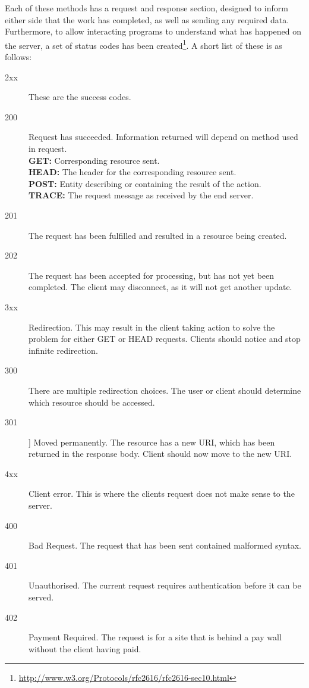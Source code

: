 \documentclass[a4paper,11pt]{report}
\begin{document}
		Each of these methods has a request and response section, 
		designed to inform either side that the work has completed, as well as sending any required data. 
		Furthermore, to allow interacting programs to understand what has happened on the server, 
		a set of status codes has been created\footnote{\url{http://www.w3.org/Protocols/rfc2616/rfc2616-sec10.html}}. 
		A short list of these is as follows:
		\begin{description}
			\item[2xx] These are the success codes. 
			\item[200] Request has succeeded. Information returned will depend on method used in request. \\
				\textbf{GET:} Corresponding resource sent. \\
				\textbf{HEAD:} The header for the corresponding resource sent. \\
				\textbf{POST:} Entity describing or containing the result of the action. \\
				\textbf{TRACE:} The request message as received by the end server. \\
			\item[201] The request has been fulfilled and resulted in a resource being created. 
			\item[202] The request has been accepted for processing, but has not yet been completed. 
				The client may disconnect, as it will not get another update. 
			\item[3xx] Redirection. 
				This may result in the client taking action to solve the problem for either GET or HEAD requests. 
				Clients should notice and stop infinite redirection. 
			\item[300] There are multiple redirection choices. 
				The user or client should determine which resource should be accessed. 
			\item[301]] Moved permanently. 
				The resource has a new URI, which has been returned in the response body. 
				Client should now move to the new URI. 
			\item[4xx] Client error.
				This is where the clients request does not make sense to the server. 
			\item[400] Bad Request. 
				The request that has been sent contained malformed syntax.
			\item[401] Unauthorised. 
				The current request requires authentication before it can be served. 
			\item[402] Payment Required.
				The request is for a site that is behind a pay wall without the client having paid. 

\end{description}
\end{document}
